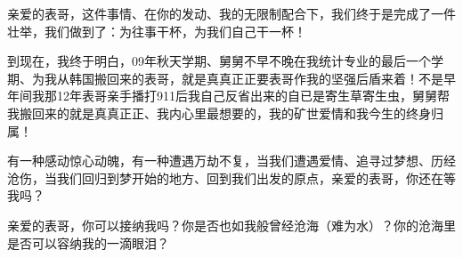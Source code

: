 \documentclass[9pt, b5paper]{article}
\begin{document}
亲爱的表哥，这件事情、在你的发动、我的无限制配合下，我们终于是完成了一件壮举，我们做到了：为往事干杯，为我们自己干一杯！

到现在，我终于明白，09年秋天学期、舅舅不早不晚在我统计专业的最后一个学期、为我从韩国搬回来的表哥，就是真真正正要表哥作我的坚强后盾来着！不是早年间我那12年表哥亲手播打911后我自己反省出来的自已是寄生草寄生虫，舅舅帮我搬回来的就是真真正正、我内心里最想要的，我的矿世爱情和我今生的终身归属！

有一种感动惊心动魄，有一种遭遇万劫不复，当我们遭遇爱情、追寻过梦想、历经沧伤，当我们回归到梦开始的地方、回到我们出发的原点，亲爱的表哥，你还在等我吗？

亲爱的表哥，你可以接纳我吗？你是否也如我般曾经沧海（难为水）？你的沧海里是否可以容纳我的一滴眼泪？
\end{document}

